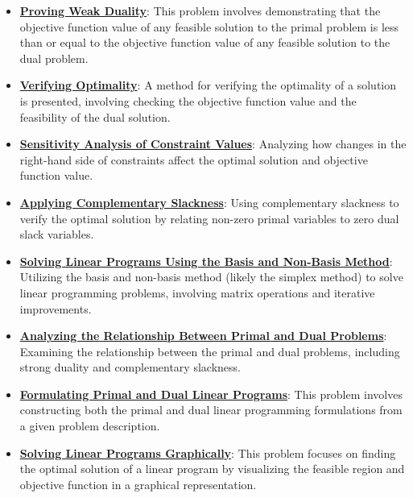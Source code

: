 \documentclass{article}%
\begin{document}
\begin{itemize}[leftmargin=*]
\item \href{https://www.math.purdue.edu/~yipn/421/2024-10-01-DualGeneralLP.pdf#page=5}{\textbf{Proving Weak Duality}}: This problem involves demonstrating that the objective function value of any feasible solution to the primal problem is less than or equal to the objective function value of any feasible solution to the dual problem. %
\item \href{https://www.math.purdue.edu/~yipn/421/2024-10-01-SensitivityDuality.pdf#page=13}{\textbf{Verifying Optimality}}: A method for verifying the optimality of a solution is presented, involving checking the objective function value and the feasibility of the dual solution. %
\item \href{https://www.math.purdue.edu/~yipn/421/2024-10-01-SensitivityDuality.pdf#page=1}{\textbf{Sensitivity Analysis of Constraint Values}}: Analyzing how changes in the right-hand side of constraints affect the optimal solution and objective function value. %
\item \href{https://www.math.purdue.edu/~yipn/421/2024-10-01-SensitivityDuality.pdf#page=3}{\textbf{Applying Complementary Slackness}}: Using complementary slackness to verify the optimal solution by relating non-zero primal variables to zero dual slack variables. %
\item \href{https://www.math.purdue.edu/~yipn/421/2024-10-01-SensitivityDuality.pdf#page=4}{\textbf{Solving Linear Programs Using the Basis and Non{-}Basis Method}}: Utilizing the basis and non-basis method (likely the simplex method) to solve linear programming problems, involving matrix operations and iterative improvements. %
\item \href{https://www.math.purdue.edu/~yipn/421/2024-10-01-SensitivityDuality.pdf#page=2}{\textbf{Analyzing the Relationship Between Primal and Dual Problems}}: Examining the relationship between the primal and dual problems, including strong duality and complementary slackness. %
\item \href{https://www.math.purdue.edu/~yipn/421/2024-10-03-DualSimplexMatrix.pdf#page=2}{\textbf{Formulating Primal and Dual Linear Programs}}: This problem involves constructing both the primal and dual linear programming formulations from a given problem description. %
\item \href{https://www.math.purdue.edu/~yipn/421/2024-10-03-DualSimplexMatrix.pdf#page=1}{\textbf{Solving Linear Programs Graphically}}: This problem focuses on finding the optimal solution of a linear program by visualizing the feasible region and objective function in a graphical representation. %

\end{itemize}
\end{document}

